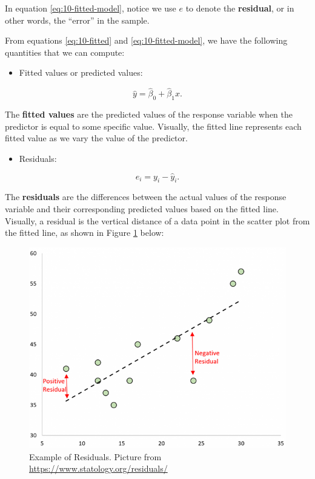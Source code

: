 \documentclass[
]{book}
\providecommand{\tightlist}{%
  \setlength{\itemsep}{0pt}\setlength{\parskip}{0pt}}
\begin{document}
In equation \eqref{eq:10-fitted-model}, notice we use \(e\) to denote the \textbf{residual}, or in other words, the ``error'' in the sample.

From equations \eqref{eq:10-fitted} and \eqref{eq:10-fitted-model}, we have the following quantities that we can compute:

\begin{itemize}
\tightlist
\item
  Fitted values or predicted values:
\end{itemize}

\begin{equation}
\hat{y} = \hat{\beta}_0+\hat{\beta}_1 x.
\label{eq:10-fits}
\end{equation}

The \textbf{fitted values} are the predicted values of the response variable when the predictor is equal to some specific value. Visually, the fitted line represents each fitted value as we vary the value of the predictor.

\begin{itemize}
\tightlist
\item
  Residuals:
\end{itemize}

\begin{equation} 
e_i = y_i-\hat{y}_i.
\label{eq:10-res}
\end{equation}

The \textbf{residuals} are the differences between the actual values of the response variable and their corresponding predicted values based on the fitted line. Visually, a residual is the vertical distance of a data point in the scatter plot from the fitted line, as shown in Figure \ref{fig:10-res} below:

\begin{figure}
\centering
\includegraphics{images/10-residuals.png}
\caption{\label{fig:10-res}Example of Residuals. Picture from \url{https://www.statology.org/residuals/}}
\end{figure}
\end{document}
